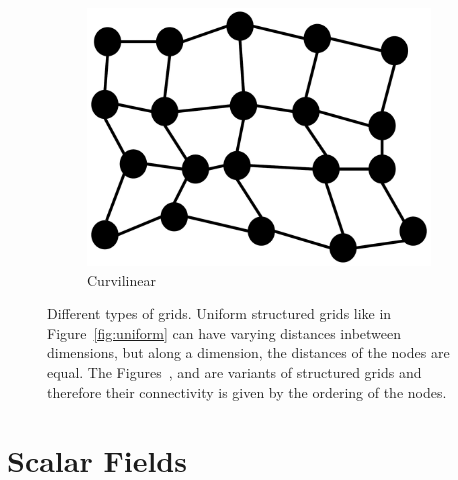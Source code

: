 \begin{figure}
\begin{subfigure}[b]{0.19\textwidth}
    \includegraphics[width=\textwidth]{Images/curvilinear.pdf}
    \caption{Curvilinear}
    \label{fig:curvilinear}
  \end{subfigure}
  \caption{Different types of grids. Uniform structured grids like in
  Figure~\ref{fig:uniform} can have varying distances inbetween
  dimensions, but along a dimension, the distances of the nodes are
  equal. The Figures~,  and
   are variants of structured grids and
  therefore their connectivity is given by the ordering of the nodes.}
  \label{fig:grids}
\end{figure}

\section{Scalar Fields}

